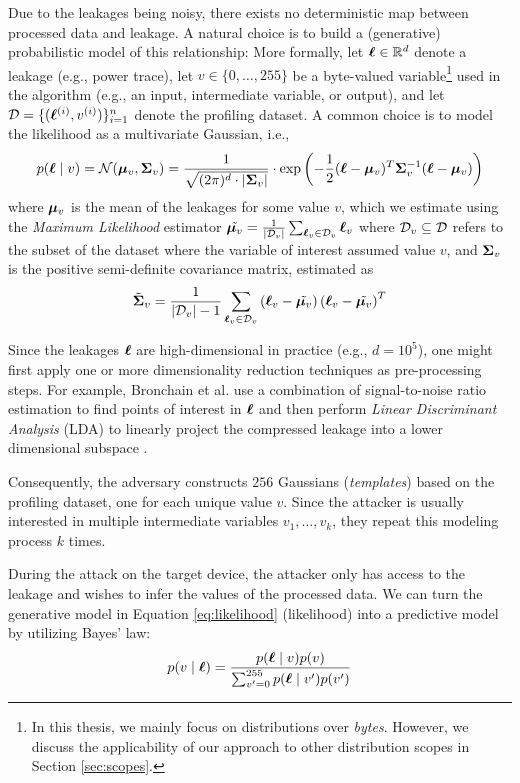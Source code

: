 Due to the leakages being noisy, there exists no deterministic map between processed data and leakage. A natural choice is to build a (generative) probabilistic model of this relationship: More formally, let $\boldsymbol{\ell} \in \mathbb{R}^d$ denote a leakage (e.g., power trace), let $v \in \{0,\dots,255\}$ be a byte-valued variable\footnote{In this thesis, we mainly focus on distributions over \textit{bytes}. However, we discuss the applicability of our approach to other distribution scopes in Section \ref{sec:scopes}.} used in the algorithm (e.g., an input, intermediate variable, or output), and let $\mathcal{D} = \{(\boldsymbol{\ell}^{(i)}, v^{(i)})\}_{i=1}^n$ denote the profiling dataset. A common choice is to model the likelihood as a multivariate Gaussian, i.e.,
\begin{equation}
\label{eq:likelihood}
    p(\boldsymbol{\ell} \mid v) = \mathcal{N}(\boldsymbol{\mu}_v, \mathbf{\Sigma}_v) = \frac{1}{\sqrt{(2\pi)^d \cdot |\mathbf{\Sigma}_v|}} \cdot \exp\left( -\frac{1}{2} (\boldsymbol{\ell} - \boldsymbol{\mu}_v)^T \mathbf{\Sigma}_v^{-1} (\boldsymbol{\ell} - \boldsymbol{\mu}_v) \right)
\end{equation}
where $\boldsymbol{\mu}_v$ is the mean of the leakages for some value $v$, which we estimate using the \textit{Maximum Likelihood} estimator $\tilde{\boldsymbol{\mu}_v} = \frac{1}{|\mathcal{D}_v|}\sum_{\boldsymbol{\ell}_v \in \mathcal{D}_v}\boldsymbol{\ell}_v$ where $\mathcal{D}_v \subseteq \mathcal{D}$ refers to the subset of the dataset where the variable of interest assumed value $v$, and $\mathbf{\Sigma}_v$ is the positive semi-definite covariance matrix, estimated as 
\begin{align}
    \tilde{\mathbf{\Sigma}}_v = \frac{1}{|\mathcal{D}_v| - 1} \sum_{\boldsymbol{\ell}_v \in \mathcal{D}_v} \left( \boldsymbol{\ell}_v - \tilde{\boldsymbol{\mu}_v} \right) \left( \boldsymbol{\ell}_v - \tilde{\boldsymbol{\mu}_v} \right)^T
\end{align}

Since the leakages $\boldsymbol{\ell}$ are high-dimensional in practice (e.g., $d=10^5$), one might first apply one or more dimensionality reduction techniques as pre-processing steps. For example, Bronchain et al. \cite{5min} use a combination of signal-to-noise ratio estimation to find points of interest in $\boldsymbol{\ell}$ and then perform \textit{Linear Discriminant Analysis} (LDA) to linearly project the compressed leakage into a lower dimensional subspace \cite{5min}.

Consequently, the adversary constructs $256$ Gaussians (\textit{templates}) based on the profiling dataset, one for each unique value $v$.
Since the attacker is usually interested in multiple intermediate variables $v_1, \dots, v_k$, they repeat this modeling process $k$ times. 


During the attack on the target device, the attacker only has access to the leakage and wishes to infer the values of the processed data. We can turn the generative model in Equation \ref{eq:likelihood} (likelihood) into a predictive model by utilizing Bayes' law: 
\begin{equation}
\label{eq:bayes}
    p(v \mid \boldsymbol{\ell}) = \frac{p(\boldsymbol{\ell} \mid v) p(v)}{\sum_{v'=0}^{255} p(\boldsymbol{\ell} \mid v') p(v')}
\end{equation}

